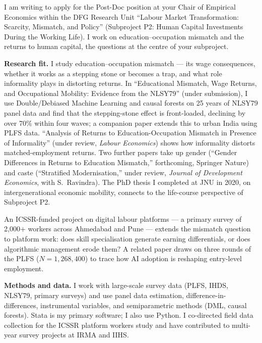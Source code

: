 \documentclass[11pt,english]{article}
\begin{document}
I am writing to apply for the Post-Doc position at your Chair of Empirical Economics within the DFG Research Unit ``Labour Market Transformation: Scarcity, Mismatch, and Policy'' (Subproject P2: Human Capital Investments During the Working Life). I work on education--occupation mismatch and the returns to human capital, the questions at the centre of your subproject.

\vspace{0.1in}

\textbf{Research fit.}
I study education--occupation mismatch --- its wage consequences, whether it works as a stepping stone or becomes a trap, and what role informality plays in distorting returns. In ``Educational Mismatch, Wage Returns, and Occupational Mobility: Evidence from the NLSY79'' (under submission), I use Double/Debiased Machine Learning and causal forests on 25 years of NLSY79 panel data and find that the stepping-stone effect is front-loaded, declining by over 70\% within four waves; a companion paper extends this to urban India using PLFS data. ``Analysis of Returns to Education-Occupation Mismatch in Presence of Informality'' (under review, \textit{Labour Economics}) shows how informality distorts matched-employment returns. Two further papers take up gender (``Gender Differences in Returns to Education Mismatch,'' forthcoming, Springer Nature) and caste (``Stratified Modernisation,'' under review, \textit{Journal of Development Economics}, with S.~Ravindra). The PhD thesis I completed at JNU in 2020, on intergenerational economic mobility, connects to the life-course perspective of Subproject P2.

An ICSSR-funded project on digital labour platforms --- a primary survey of 2,000+ workers across Ahmedabad and Pune --- extends the mismatch question to platform work: does skill specialisation generate earning differentials, or does algorithmic management erode them? A related paper draws on three rounds of the PLFS ($N = 1{,}268{,}400$) to trace how AI adoption is reshaping entry-level employment.

\vspace{0.1in}

\textbf{Methods and data.}
I work with large-scale survey data (PLFS, IHDS, NLSY79, primary surveys) and use panel data estimation, difference-in-differences, instrumental variables, and semiparametric methods (DML, causal forests). Stata is my primary software; I also use Python. I co-directed field data collection for the ICSSR platform workers study and have contributed to multi-year survey projects at IRMA and IIHS.
\end{document}
